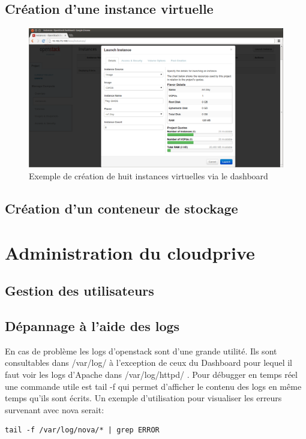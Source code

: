 \documentclass[a4paper,oneside]{report}
\begin{document}
\section{Création d'une instance virtuelle}
\begin{figure}[!h]
\centering
\includegraphics[resolution=200]{images/dashboard_create_details.png}
\caption{Exemple de création de huit instances virtuelles via le dashboard}
\end{figure}

\section{Création d'un conteneur de stockage}

\chapter{Administration du \gls{cloudprive}}

\section{Gestion des utilisateurs}

\section{Dépannage à l'aide des logs}
En cas de problème les logs d'\gls{openstack} sont d'une grande utilité. Ils sont consultables dans /var/log/ à l'exception de ceux du Dashboard pour lequel il faut voir les logs d'Apache dans /var/log/httpd/ .
Pour débugger en temps réel une commande utile est tail -f qui permet d'afficher le contenu des logs en même temps qu'ils sont écrits.
Un exemple d'utilisation pour visualiser les erreurs survenant avec nova serait:
\begin{verbatim}
tail -f /var/log/nova/* | grep ERROR
\end{verbatim}
\end{document}
